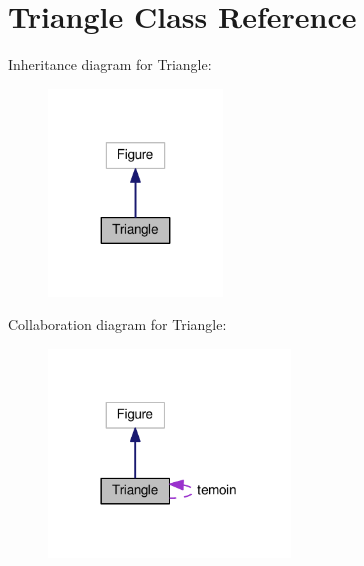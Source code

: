 \hypertarget{class_triangle}{}\section{Triangle Class Reference}
\label{class_triangle}


Inheritance diagram for Triangle\+:
\nopagebreak
\begin{figure}[H]
\begin{center}
\leavevmode
\includegraphics[width=131pt]{class_triangle__inherit__graph}
\end{center}
\end{figure}


Collaboration diagram for Triangle\+:
\nopagebreak
\begin{figure}[H]
\begin{center}
\leavevmode
\includegraphics[width=182pt]{class_triangle__coll__graph}
\end{center}
\end{figure}
